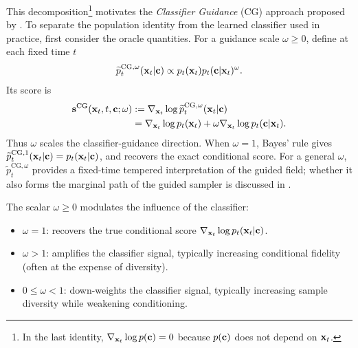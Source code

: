 This decomposition\footnote{In the last identity,
$\nabla_{{\mathbf{x}}_t}\log p({\mathbf{c}})=0$ because $p({\mathbf{c}})$ does not depend on
${\mathbf{x}}_t$.} motivates the \emph{Classifier Guidance} (CG) approach proposed by
\citet{dhariwal2021diffusion}. To separate the population identity from the
learned classifier used in practice, first consider the oracle quantities.
For a guidance scale $\omega\geq0$, define at each fixed time $t$
\begin{align}
\widetilde p_t^{\mathrm{CG},\omega}({\mathbf{x}}_t|{\mathbf{c}})
\propto
p_t({\mathbf{x}}_t)p_t({\mathbf{c}}|{\mathbf{x}}_t)^\omega.
\label{eq:cg-density-omega}
\end{align}
Its score is
\begin{align}
{\mathbf{s}}^{\mathrm{CG}}({\mathbf{x}}_t,t,{\mathbf{c}};\omega)
&:=
\nabla_{{\mathbf{x}}_t}
\log\widetilde p_t^{\mathrm{CG},\omega}({\mathbf{x}}_t|{\mathbf{c}})
\nonumber\\
&=
\nabla_{{\mathbf{x}}_t}\log p_t({\mathbf{x}}_t)
+
\omega\nabla_{{\mathbf{x}}_t}\log p_t({\mathbf{c}}|{\mathbf{x}}_t).
\label{eq:cg_omega}
\end{align}
Thus $\omega$ scales the classifier-guidance direction. When $\omega=1$,
Bayes' rule gives
$\widetilde p_t^{\mathrm{CG},1}({\mathbf{x}}_t|{\mathbf{c}})=p_t({\mathbf{x}}_t|{\mathbf{c}})$, and
 recovers the exact conditional score. For a general
$\omega$, $\widetilde p_t^{\mathrm{CG},\omega}$ provides a fixed-time tempered
interpretation of the guided field; whether it also forms the marginal path of
the guided sampler is discussed in
.

The scalar $\omega \ge 0$ modulates the influence of the classifier:
\begin{itemize}
    \item $\omega = 1$: recovers the true conditional score $\nabla_{{\mathbf{x}}_t} \log p_t({\mathbf{x}}_t |{\mathbf{c}})$.
    \item $\omega > 1$: amplifies the classifier signal, typically increasing conditional fidelity (often at the expense of diversity).
    \item $0 \le \omega < 1$: down-weights the classifier signal, typically increasing sample diversity while weakening conditioning.
\end{itemize}

